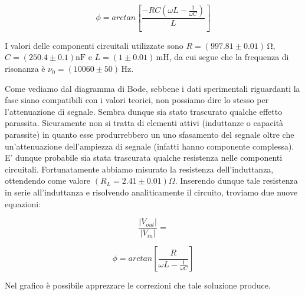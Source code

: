 \begin{equation}
\phi=arctan\left[\frac{-RC(\omega L-\frac{1}{\omega C})}{L}\right]
\label{eq:bpfPhi}
\end{equation}

\noindent I valori delle componenti circuitali utilizzate sono $R=(997.81 \pm 0.01)\,\si{\ohm}$, $C=(250.4 \pm 0.1)\si{\nano\farad}$ e $L=(1 \pm 0.01)\,\si{\milli\henry}$, da cui segue che la frequenza di risonanza è $\nu_0 = (10060 \pm 50)\,\si{\hertz}$.

Come vediamo dal diagramma di Bode, sebbene i dati sperimentali riguardanti la fase siano compatibili con i valori teorici, non possiamo dire lo stesso per l'attenuazione di segnale. Sembra dunque sia stato trascurato qualche effetto parassita. Sicuramente non si tratta di elementi attivi (induttanze o capacità parassite) in quanto esse produrrebbero un uno sfasamento del segnale oltre che un'attenuazione dell'ampiezza di segnale (infatti hanno componente complessa). E' dunque probabile sia stata trascurata qualche resistenza nelle componenti circuitali. Fortunatamente abbiamo misurato la resistenza dell'induttanza, ottendendo come valore $(R_L=2.41\pm 0.01) \Omega$. Inserendo dunque tale resistenza in serie all'induttanza e risolvendo analiticamente il circuito, troviamo due nuove equazioni:\\

\noindent
\begin{minipage}{.5\linewidth}
\begin{equation}
\frac{|V_{out}|}{|V_{in}|}=
\label{bpfGain_corr}
\end{equation}
\end{minipage}%
\begin{minipage}{.5\linewidth}
\begin{equation}
\phi=arctan\left[\frac{R}{\omega L-\frac{1}{\omega C}}\right]
\label{bpfPhi_corr}
\end{equation}
\end{minipage}
\break
\noindent Nel grafico è possibile apprezzare le correzioni che tale soluzione produce.